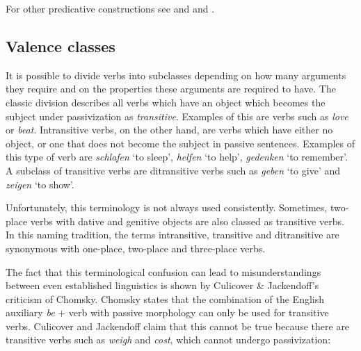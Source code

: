 For other predicative constructions see  and 
and .


\subsection{Valence classes}
\label{sec-valence-classes}

It is possible to divide verbs into subclasses depending on how many arguments they require and on the properties these arguments are required to have. The
classic division describes all verbs which have an object which becomes the subject under passivization as \emph{transitive}. Examples of this
are verbs such as \emph{love} or \emph{beat}. Intransitive verbs, on the other hand, are verbs which have either no object, or one that does not become the subject in passive
sentences. Examples of this type of verb are \emph{schlafen} `to sleep', \emph{helfen} `to help', \emph{gedenken} `to remember'. A subclass of transitive verbs are 
ditransitive verbs such as \emph{geben} `to give' and \emph{zeigen} `to show'.

Unfortunately, this terminology is not always used consistently. Sometimes, two-place verbs with
dative and genitive objects are also classed as transitive verbs. In this naming tradition, the
terms intransitive, transitive and ditransitive are synonymous with one-place, two-place and
three-place verbs.

The fact that this terminological confusion can lead to misunderstandings between even established linguistics is shown by Culicover \& Jackendoff's \citeyearpar[]{CJ2005a} criticism 
of Chomsky. Chomsky states that the combination of the English auxiliary \emph{be} $+$ verb with passive morphology can only be used for transitive verbs. Culicover and Jackendoff claim that this cannot
be true because there are transitive verbs such as \emph{weigh} and \emph{cost}, which cannot undergo passivization:
\eal
{}
\zl

